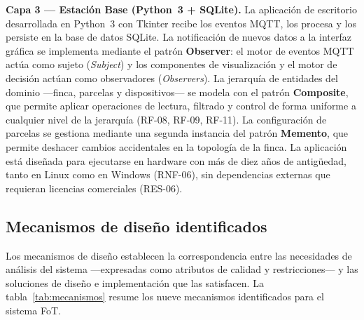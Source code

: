 \noindent\textbf{Capa 3 — Estación Base (Python~3 + SQLite).} La aplicación
de escritorio desarrollada en Python~3 con Tkinter recibe los eventos MQTT,
los procesa y los persiste en la base de datos SQLite. La notificación de
nuevos datos a la interfaz gráfica se implementa mediante el patrón
\textbf{Observer}: el motor de eventos MQTT actúa como sujeto (\textit{Subject})
y los componentes de visualización y el motor de decisión actúan como
observadores (\textit{Observers}). La jerarquía de entidades del dominio —finca,
parcelas y dispositivos— se modela con el patrón \textbf{Composite}, que
permite aplicar operaciones de lectura, filtrado y control de forma uniforme
a cualquier nivel de la jerarquía (RF-08, RF-09, RF-11). La configuración de
parcelas se gestiona mediante una segunda instancia del patrón
\textbf{Memento}, que permite deshacer cambios accidentales en la topología
de la finca. La aplicación está diseñada para ejecutarse en hardware con más
de diez años de antigüedad, tanto en Linux como en Windows (RNF-06), sin
dependencias externas que requieran licencias comerciales (RES-06).


\subsection{Mecanismos de diseño identificados}
\label{sec:mecanismos}

Los mecanismos de diseño establecen la correspondencia entre las necesidades
de análisis del sistema —expresadas como atributos de calidad y
restricciones— y las soluciones de diseño e implementación que las satisfacen.
La tabla~\ref{tab:mecanismos} resume los nueve mecanismos identificados para
el sistema FoT.

